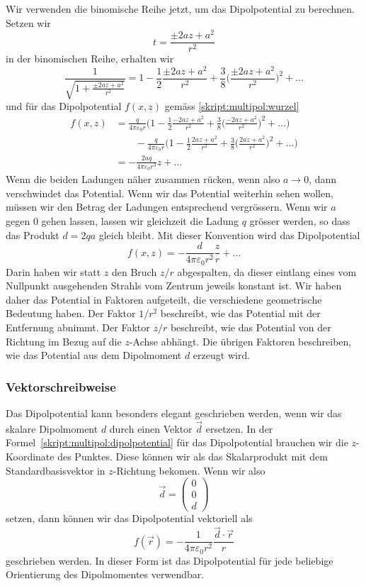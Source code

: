 Wir verwenden die binomische Reihe jetzt, um das Dipolpotential
zu berechnen.
Setzen wir 
\[
t=\frac{\pm 2az+a^2}{r^2}
\]
in der binomischen Reihe, erhalten wir
\[
\frac{1}{\sqrt{1+\frac{\pm 2az+a^2}{r^2}}}
=
1-\frac12\frac{\pm 2az+a^2}{r^2}
+
\frac38 \biggl(\frac{\pm 2az+a^2}{r^2}\biggr)^2+\dots
\]
und für das Dipolpotential $f(x,z)$ gemäss \eqref{skript:multipol:wurzel}
\begin{align*}
f(x,z)
&=
\frac{q}{4\pi\varepsilon_0 r}
\biggl(
1-\frac12\frac{-2az+a^2}{r^2} + \frac38 \biggl(\frac{-2az+a^2}{r^2}\biggr)^2+\dots
\biggr)
\\
&\qquad
-
\frac{q}{4\pi\varepsilon_0 r}
\biggl(
1-\frac12\frac{2az+a^2}{r^2} + \frac38 \biggl(\frac{2az+a^2}{r^2}\biggr)^2+\dots
\biggr)
\\
&=
-\frac{2aq}{4\pi\varepsilon_0r^3}z + \dots
\end{align*}
Wenn die beiden Ladungen näher zusammen rücken, wenn also $a\to 0$,
dann verschwindet das Potential.
Wenn wir das Potential weiterhin sehen wollen, müssen wir den Betrag
der Ladungen entsprechend vergrössern.
Wenn wir $a$ gegen $0$ gehen lassen, lassen wir gleichzeit die Ladung
$q$ grösser werden, so dass das Produkt $d=2qa$ gleich bleibt.
Mit dieser Konvention wird das Dipolpotential
\begin{equation}
f(x,z) = -\frac{d}{4\pi\varepsilon_0 r^2}\frac{z}{r}+\dots
\label{skript:multipol:dipolpotential}
\end{equation}
Darin haben wir statt $z$ den Bruch $z/r$ abgespalten, da dieser
eintlang eines vom Nullpunkt ausgehenden Strahls vom Zentrum jeweils
konstant ist.
Wir haben daher das Potential in Faktoren aufgeteilt, die verschiedene
geometrische Bedeutung haben.
Der Faktor $1/r^2$ beschreibt, wie das Potential mit der Entfernung abnimmt.
Der Faktor $z/r$ beschreibt, wie das Potential von der Richtung im
Bezug auf die $z$-Achse abhängt.
Die übrigen Faktoren beschreiben, wie das Potential aus dem Dipolmoment
$d$ erzeugt wird.

\subsubsection{Vektorschreibweise}
Das Dipolpotential kann besonders elegant geschrieben werden, wenn
wir das skalare Dipolmoment $d$ durch einen Vektor $\vec{d}$ ersetzen.
In der Formel~\eqref{skript:multipol:dipolpotential}
für das Dipolpotential brauchen wir die $z$-Koordinate
des Punktes.
Diese können wir als das Skalarprodukt mit dem Standardbasisvektor
in $z$-Richtung bekomen.
Wenn wir also
\[
\vec{d}=\begin{pmatrix}0\\0\\d\end{pmatrix}
\]
setzen, dann können wir das Dipolpotential vektoriell als
\begin{equation*}
f(\vec{r})
=
-
\frac{1}{4\pi\varepsilon_0r^2} \frac{\vec{d}\cdot\vec{r}}{r}
\end{equation*}
geschrieben werden.
In dieser Form ist das Dipolpotential für jede beliebige Orientierung
des Dipolmomentes verwendbar.

